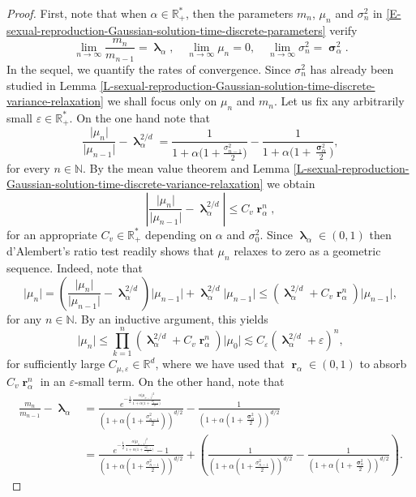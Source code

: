 \documentclass[reqno]{amsart}
\DeclareMathOperator{\blambda}{\boldsymbol{\lambda}}
\DeclareMathOperator{\bsigma}{\boldsymbol{\sigma}}
\DeclareMathOperator{\br}{\boldsymbol{r}}
\numberwithin{equation}{section}
\begin{document}
{\begin{proof}
First, note that when $\alpha\in \mathbb{R}_+^*$, then the parameters $m_n$, $\mu_n$ and $\sigma_n^2$ in \eqref{E-sexual-reproduction-Gaussian-solution-time-discrete-parameters} verify
$$\lim_{n\rightarrow \infty}\frac{m_n}{m_{n-1}}=\blambda_\alpha,\quad \lim_{n\rightarrow \infty}\mu_n=0,\quad \lim_{n\rightarrow \infty}\sigma_n^2=\bsigma_\alpha^2.$$
In the sequel, we quantify the rates of convergence. Since $\sigma_n^2$ has already been studied in Lemma \ref{L-sexual-reproduction-Gaussian-solution-time-discrete-variance-relaxation} we shall focus only on $\mu_n$ and $m_n$. Let us fix any arbitrarily small $\varepsilon\in \mathbb{R}_+^*$. On the one hand note that
$$\frac{\vert \mu_n\vert }{\vert \mu_{n-1}\vert }-\blambda_\alpha^{2/d}=\frac{1}{1+\alpha\big(1+\frac{\sigma_{n-1}^2}{2}\big)}-\frac{1}{1+\alpha\big(1+\frac{\bsigma_\alpha^2}{2}\big)},$$
for every $n\in \mathbb{N}$. By the mean value theorem and Lemma \ref{L-sexual-reproduction-Gaussian-solution-time-discrete-variance-relaxation} we obtain
$$\left\vert\frac{\vert \mu_n\vert }{\vert \mu_{n-1}\vert }-\blambda_\alpha^{2/d}\right\vert\leq C_v\br_\alpha^n,$$
for an appropriate $C_v\in \mathbb{R}_+^*$ depending on $\alpha$ and $\sigma_0^2$. Since $\blambda_\alpha\in (0,1)$ then d'Alembert's ratio test readily shows that $\mu_n$ relaxes to zero as a geometric sequence. Indeed, note that
$$\vert \mu_n\vert=\left(\frac{\vert \mu_n\vert}{\vert \mu_{n-1}\vert}-\blambda_\alpha^{2/d}\right)\vert \mu_{n-1}\vert+\blambda_\alpha^{2/d}\vert \mu_{n-1}\vert\leq (\blambda_\alpha^{2/d}+C_v\br_\alpha^n)\vert \mu_{n-1}\vert ,$$
for any $n\in \mathbb{N}$. By an inductive argument, this yields
\begin{equation}\label{E-center-mass-contraction}
\vert \mu_n\vert\leq \prod_{k=1}^n(\blambda_\alpha^{2/d}+C_v\br_\alpha^n)\vert \mu_0\vert\lesssim C_\varepsilon(\blambda_\alpha^{2/d}+\varepsilon)^n,
\end{equation}
for sufficiently large $C_{\mu,\varepsilon}\in \mathbb{R}^d$, where we have used that $\br_\alpha\in (0,1)$ to absorb $C_v\br_\alpha^n$ in an $\varepsilon$-small term. On the other hand, note that
\begin{align*}
\frac{m_n}{m_{n-1}}-\blambda_\alpha&=\frac{e^{-\frac{1}{2}\frac{\alpha\vert \mu_{n-1}\vert^2}{1+\alpha\big(1+\frac{\sigma_{n-1}^2}{2}\big)}}}{(1+\alpha(1+\frac{\sigma_{n-1}^2}{2}))^{d/2}}-\frac{1}{(1+\alpha(1+\frac{\bsigma_\alpha^2}{2}))^{d/2}}\\
&=\frac{e^{-\frac{1}{2}\frac{\alpha\vert \mu_{n-1}\vert^2}{1+\alpha\big(1+\frac{\sigma_{n-1}^2}{2}\big)}}-1}{(1+\alpha(1+\frac{\sigma_{n-1}^2}{2}))^{d/2}}+\left(\frac{1}{(1+\alpha(1+\frac{\sigma_{n-1}^2}{2}))^{d/2}}-\frac{1}{(1+\alpha(1+\frac{\bsigma_\alpha^2}{2}))^{d/2}}\right).

\end{align*}
\end{proof}}
\end{document}

